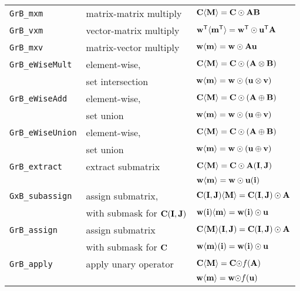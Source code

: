 \documentclass[12pt]{article}
\begin{document}
\vspace{0.2in}
{\small
\begin{tabular}{lll}
\hline
\verb'GrB_mxm'       & matrix-matrix multiply  & ${\bf C \langle M \rangle = C \odot AB}$ \\
\verb'GrB_vxm'       & vector-matrix multiply  & ${\bf w^{\sf T}\langle m^{\sf T}\rangle = w^{\sf T}\odot u^{\sf T}A}$ \\
\verb'GrB_mxv'       & matrix-vector multiply  & ${\bf w \langle m \rangle = w \odot Au}$ \\
\hline
\verb'GrB_eWiseMult' & element-wise,           & ${\bf C \langle M \rangle = C \odot (A \otimes B)}$ \\
                     & set intersection        & ${\bf w \langle m \rangle = w \odot (u \otimes v)}$ \\
\hline
\verb'GrB_eWiseAdd'  & element-wise,           & ${\bf C \langle M \rangle = C \odot (A \oplus  B)}$ \\
                     & set union               & ${\bf w \langle m \rangle = w \odot (u \oplus  v)}$ \\
\hline
\verb'GrB_eWiseUnion'& element-wise,           & ${\bf C \langle M \rangle = C \odot (A \oplus  B)}$ \\
                     & set union               & ${\bf w \langle m \rangle = w \odot (u \oplus  v)}$ \\
\hline
\verb'GrB_extract'   & extract submatrix       & ${\bf C \langle M \rangle = C \odot A(I,J)}$ \\
                     &                         & ${\bf w \langle m \rangle = w \odot u(i)}$ \\
\hline
\verb'GxB_subassign' & assign submatrix,       & ${\bf C (I,J) \langle M \rangle = C(I,J) \odot A}$ \\
                     & with submask for ${\bf C(I,J)}$
                                               & ${\bf w (i)   \langle m \rangle = w(i)   \odot u}$ \\
\hline
\verb'GrB_assign'    & assign submatrix        & ${\bf C \langle M \rangle (I,J) = C(I,J) \odot A}$ \\
                     & with submask for ${\bf C}$
                                               & ${\bf w \langle m \rangle (i)   = w(i)   \odot u}$ \\
\hline
\verb'GrB_apply'     & apply unary operator    & ${\bf C \langle M \rangle = C \odot} f{\bf (A)}$ \\
                     &                         & ${\bf w \langle m \rangle = w \odot} f{\bf (u)}$ \\

\end{tabular}}
\end{document}
